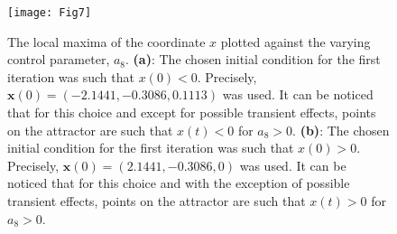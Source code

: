 \documentclass[final,5p,times,twocolumn]{elsarticle}
\begin{document}
\begin{figure}[htbp]
	\texttt{[image: Fig7]}
	\caption{The local maxima of the coordinate $x$ plotted against the varying control parameter, $a_8$. \textbf{(a)}: The chosen initial condition for the first iteration was such that $x(0)<0$. Precisely, $\bm{x}(0)=(-2.1441,-0.3086,0.1113)$ was used. It can be noticed that for this choice and except for possible transient effects, points on the attractor are such that $x(t)<0$ for $a_8>0$. \textbf{(b)}: The chosen initial condition for the first iteration was such that $x(0)>0$. Precisely, $\bm{x}(0)=(2.1441,-0.3086,0)$ was used. It can be noticed that for this choice and with the exception of possible transient effects, points on the attractor are such that $x(t)>0$ for $a_8>0$.}
	\label{bfa8}
\end{figure}
\end{document}
